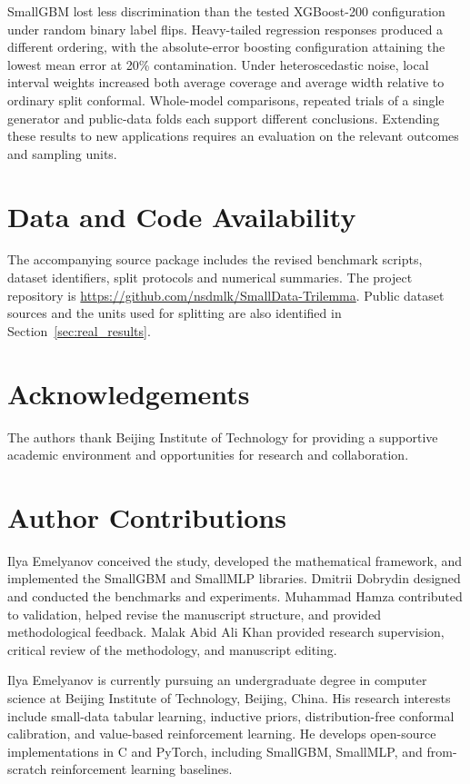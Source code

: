 \documentclass[journal]{IEEEtran}
\begin{document}
SmallGBM lost less discrimination than the tested XGBoost-200 configuration under random binary label flips. Heavy-tailed regression responses produced a different ordering, with the absolute-error boosting configuration attaining the lowest mean error at 20\% contamination. Under heteroscedastic noise, local interval weights increased both average coverage and average width relative to ordinary split conformal. Whole-model comparisons, repeated trials of a single generator and public-data folds each support different conclusions. Extending these results to new applications requires an evaluation on the relevant outcomes and sampling units.

\section*{Data and Code Availability}
The accompanying source package includes the revised benchmark scripts, dataset identifiers, split protocols and numerical summaries. The project repository is \url{https://github.com/nsdmlk/SmallData-Trilemma}. Public dataset sources and the units used for splitting are also identified in Section~\ref{sec:real_results}.

\section*{Acknowledgements}
The authors thank Beijing Institute of Technology for providing a supportive academic environment and opportunities for research and collaboration.

\section*{Author Contributions}
Ilya Emelyanov conceived the study, developed the mathematical framework, and implemented the SmallGBM and SmallMLP libraries. Dmitrii Dobrydin designed and conducted the benchmarks and experiments. Muhammad Hamza contributed to validation, helped revise the manuscript structure, and provided methodological feedback. Malak Abid Ali Khan provided research supervision, critical review of the methodology, and manuscript editing.




\begin{IEEEbiographynophoto}{Ilya Emelyanov}
is currently pursuing an undergraduate degree in computer science at Beijing Institute of Technology, Beijing, China. His research interests include small-data tabular learning, inductive priors, distribution-free conformal calibration, and value-based reinforcement learning. He develops open-source implementations in C and PyTorch, including SmallGBM, SmallMLP, and from-scratch reinforcement learning baselines.
\end{IEEEbiographynophoto}
\end{document}
